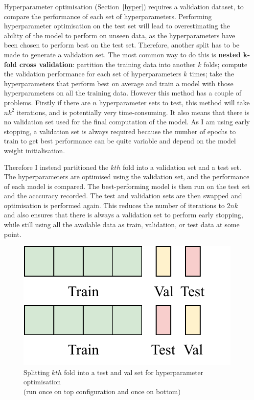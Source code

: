 Hyperparameter optimisation (Section~\ref{hyper}) requires a validation dataset, to 
compare the performance of each set of hyperparameters. Performing hyperparameter optimisation on the test set will lead to overestimating 
the ability of the model to perform on unseen data, as the hyperparameters have been chosen to perform best on the test set. Therefore,
another split has to be made to generate a validation set. The most common way to do this is \textbf{nested k-fold cross validation}:
partition the training data into another $k$ folds; compute the validation performance for each set of hyperparameters $k$ times; take the 
hyperparameters that perform best on average and train a model with those hyperparameters on all the training data.
However this method has a couple of problems. Firstly if there are $n$ hyperparameter sets to test, this method will take $nk^{2}$ 
iterations, and is potentially very time-consuming. It also means that there is no validation set used 
for the final computation of the model. As I am using early stopping, a validation set is always required because the number of epochs 
to train to get best performance can be quite variable and depend on the model weight initialisation.

Therefore I instead partitioned the $kth$ fold into a validation set and a test set. The hyperparameters are optimised using the 
validation set, and the performance of each model is compared. The best-performing model is then run on the test set and the acccuracy
recorded. The test and validation sets are then swapped and optimisation is performed again. This reduces the number of iterations to
$2nk$ and also ensures that there is always a validation set to perform early stopping, while still using all the available data as train, 
validation, or test data at some point.
\begin{figure}[H]
  \centering
  \includegraphics[scale=0.6]{figs/test_val_split.pdf}
  \caption[Splitting $kth$ fold]{Splitting $kth$ fold into a test and val set for hyperparameter optimisation \\ (run once on top configuration and once on bottom)}
\end{figure}


